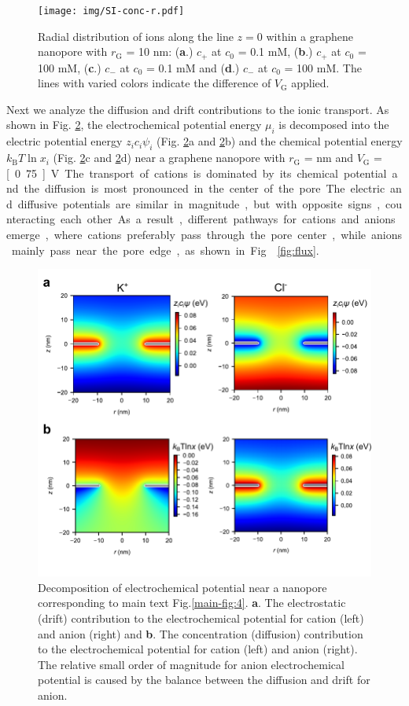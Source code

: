 \documentclass[manuscript=suppinfo,email=true, hyperref=true, keywords=false]{achemso}
\newcommand{\Fig}{Fig.}
\begin{document}
\begin{figure}[htbp]
  \centering
  \texttt{[image: img/SI-conc-r.pdf]}
  \caption{Radial distribution of ions along the line $z=0$ within a
    graphene nanopore with $r_{\mathrm{G}}$ = 10 nm: (\textbf{a}.)
    $c_{+}$ at $c_{0}$ = 0.1 mM, (\textbf{b}.) $c_{+}$ at $c_{0}$ =
    100 mM, (\textbf{c}.) $c_{-}$ at $c_{0}$ = 0.1 mM and
    (\textbf{d}.) $c_{-}$ at $c_{0}$ = 100 mM. The lines with varied
    colors indicate the difference of $V_{\mathrm{G}}$ applied.}
  \label{fig:conc-r}
\end{figure}

Next we analyze the diffusion and drift contributions to the ionic
transport. As shown in \Fig{} \ref{fig:potential}, the
electrochemical potential energy $\mu_{i}$ is decomposed into the
electric potential energy $z_{i} c_{i} \psi_{i}$ (\Fig{}
\ref{fig:potential}a and \ref{fig:potential}b) and the chemical
potential energy $k_{\mathrm{B}}T \ln x_{i}$ (\Fig{}
\ref{fig:potential}c and \ref{fig:potential}d) near a graphene
nanopore with $r_{\mathrm{G}}$ = \unit[10]{nm} and $V_{\mathrm{G}}$ = \unit[0.75]
{V}. The transport of cations is dominated by its chemical potential and
the diffusion is most pronounced in the center of the pore. The electric and diffusive potentials are similar in magnitude, but with
opposite signs, counteracting each other. As a result, different pathways for cations
and anions emerge, where cations preferably pass through the pore
center, while anions mainly pass near the pore edge, as shown in
\Fig{} \ref{fig:flux}.

\begin{figure}[htbp]
  \centering
  \includegraphics[width=0.8\linewidth]{img/SI-electrochemical-decomposite.pdf}
  \caption{Decomposition of electrochemical potential near a nanopore
    corresponding to main text \Fig \ref{main-fig:4}. \textbf{a}. The electrostatic
    (drift) contribution to the electrochemical potential for cation
    (left) and anion (right) and \textbf{b}. The concentration (diffusion)
    contribution to the electrochemical potential for cation (left)
    and anion (right). The relative small order of magnitude for anion
    electrochemical potential is caused by the balance between the
    diffusion and drift for anion.}
  \label{fig:potential}
\end{figure}
\end{document}
